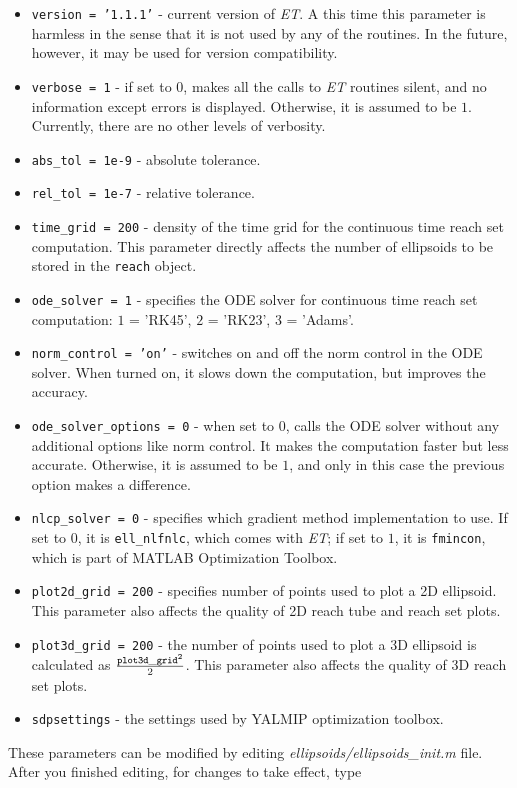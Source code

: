 \begin{itemize}
\item {\tt version = '1.1.1'} - current version of {\it ET}. A this time
this parameter is harmless in the sense that it is not used by any of the
routines. In the future, however, it may be used for version compatibility.
\item {\tt verbose = 1} - if set to $0$, makes all the calls to {\it ET}
routines silent, and no information except errors is displayed. Otherwise,
it is assumed to be $1$. Currently, there are no other levels of verbosity.
\item {\tt abs\_tol = 1e-9} - absolute tolerance.
\item {\tt rel\_tol = 1e-7} - relative tolerance.
\item {\tt time\_grid = 200} - density of the time grid for the
continuous time reach set computation.
This parameter directly affects the number of ellipsoids to
be stored in the {\tt reach} object.
\item {\tt ode\_solver = 1} - specifies the ODE solver for continuous time
reach set computation: $1$ = 'RK45', $2$ = 'RK23', $3$ = 'Adams'.
\item {\tt norm\_control = 'on'} - switches on and off the norm control
in the ODE solver. When turned on, it slows down the computation, but improves
the accuracy.
\item {\tt ode\_solver\_options = 0} - when set to $0$, calls the ODE solver
without any additional options like norm control. It makes the computation
faster but less accurate. Otherwise, it is assumed to be $1$, and only in this
case the previous option makes a difference.
\item {\tt nlcp\_solver = 0} - specifies which gradient method implementation
to use. If set to $0$, it is {\tt ell\_nlfnlc}, which comes with {\it ET};
if set to $1$, it is {\tt fmincon}, which is part of MATLAB Optimization Toolbox.
\item {\tt plot2d\_grid = 200} - specifies number of points used to plot a
2D ellipsoid. This parameter also affects the quality of 2D reach tube
and reach set plots.
\item {\tt plot3d\_grid = 200} - the number of points used to plot
a 3D ellipsoid is calculated as $\frac{{\tt plot3d\_grid}^2}{2}$.
This parameter also affects the quality of 3D reach set plots.
\item {\tt sdpsettings} - the settings used by YALMIP optimization toolbox.
\end{itemize}
These parameters can be modified by editing {\it ellipsoids/ellipsoids\_init.m}
file. After you finished editing, for changes to take effect, type

